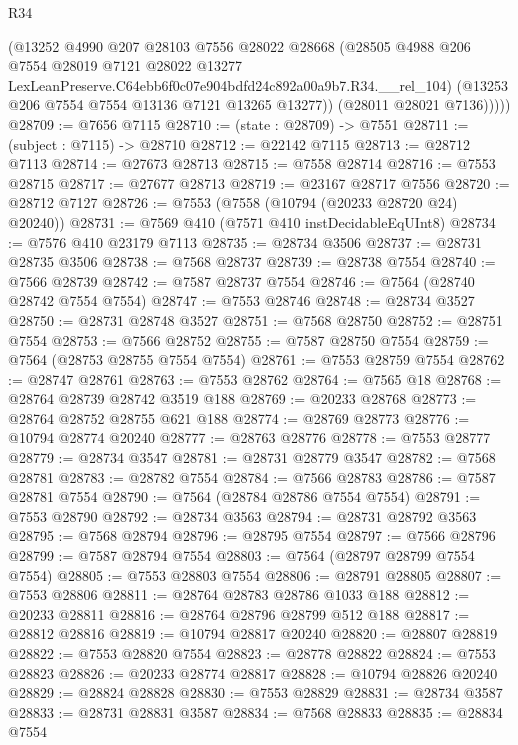 \begin{lexlean}{R34}
\begin{coremodule}
            (@13252
              @4990
              @207
              @28103
              @7556
              @28022
              @28668
              (@28505
                @4988
                @206
                @7554
                @28019
                @7121
                @28022
                @13277
                LexLeanPreserve.C64ebb6f0c07e904bdfd24c892a00a9b7.R34.__rel_104)
              (@13253 @206 @7554 @7554 @13136 @7121 @13265 @13277))
            (@28011 @28021 @7136)))))
@28709 := @7656 @7115
@28710 := (state : @28709) -> @7551
@28711 := (subject : @7115) -> @28710
@28712 := @22142 @7115
@28713 := @28712 @7113
@28714 := @27673 @28713
@28715 := @7558 @28714
@28716 := @7553 @28715
@28717 := @27677 @28713
@28719 := @23167 @28717 @7556
@28720 := @28712 @7127
@28726 := @7553 (@7558 (@10794 (@20233 @28720 @24) @20240))
@28731 := @7569 @410 (@7571 @410 instDecidableEqUInt8)
@28734 := @7576 @410 @23179 @7113
@28735 := @28734 @3506
@28737 := @28731 @28735 @3506
@28738 := @7568 @28737
@28739 := @28738 @7554
@28740 := @7566 @28739
@28742 := @7587 @28737 @7554
@28746 := @7564 (@28740 @28742 @7554 @7554)
@28747 := @7553 @28746
@28748 := @28734 @3527
@28750 := @28731 @28748 @3527
@28751 := @7568 @28750
@28752 := @28751 @7554
@28753 := @7566 @28752
@28755 := @7587 @28750 @7554
@28759 := @7564 (@28753 @28755 @7554 @7554)
@28761 := @7553 @28759 @7554
@28762 := @28747 @28761
@28763 := @7553 @28762
@28764 := @7565 @18
@28768 := @28764 @28739 @28742 @3519 @188
@28769 := @20233 @28768
@28773 := @28764 @28752 @28755 @621 @188
@28774 := @28769 @28773
@28776 := @10794 @28774 @20240
@28777 := @28763 @28776
@28778 := @7553 @28777
@28779 := @28734 @3547
@28781 := @28731 @28779 @3547
@28782 := @7568 @28781
@28783 := @28782 @7554
@28784 := @7566 @28783
@28786 := @7587 @28781 @7554
@28790 := @7564 (@28784 @28786 @7554 @7554)
@28791 := @7553 @28790
@28792 := @28734 @3563
@28794 := @28731 @28792 @3563
@28795 := @7568 @28794
@28796 := @28795 @7554
@28797 := @7566 @28796
@28799 := @7587 @28794 @7554
@28803 := @7564 (@28797 @28799 @7554 @7554)
@28805 := @7553 @28803 @7554
@28806 := @28791 @28805
@28807 := @7553 @28806
@28811 := @28764 @28783 @28786 @1033 @188
@28812 := @20233 @28811
@28816 := @28764 @28796 @28799 @512 @188
@28817 := @28812 @28816
@28819 := @10794 @28817 @20240
@28820 := @28807 @28819
@28822 := @7553 @28820 @7554
@28823 := @28778 @28822
@28824 := @7553 @28823
@28826 := @20233 @28774 @28817
@28828 := @10794 @28826 @20240
@28829 := @28824 @28828
@28830 := @7553 @28829
@28831 := @28734 @3587
@28833 := @28731 @28831 @3587
@28834 := @7568 @28833
@28835 := @28834 @7554

\end{coremodule}
\end{lexlean}
